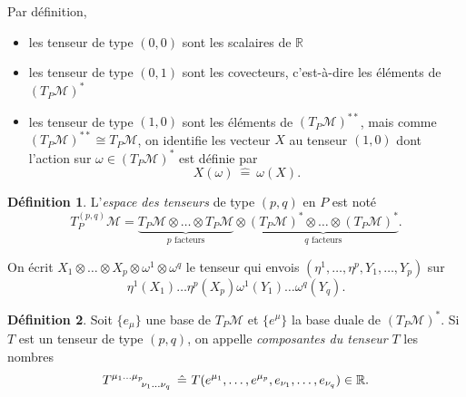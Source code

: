 \documentclass[a4paper,11pt]{report}
\theoremstyle{definition}
\theoremstyle{plain}
\theoremstyle{definition}
\newtheorem{defn}{Définition}[chapter]
\theoremstyle{remark}
\newcommand{\M}{\mathscr{M}}
\begin{document}
                Par définition,
                \begin{itemize}[label = \textbullet]
                    \item les tenseur de type $(0,0)$ sont les scalaires de $\mathbb{R}$
                    \item les tenseur de type $(0,1)$ sont les covecteurs, c'est-à-dire les éléments de $(T_P\M)^*$
                    \item les tenseur de type $(1,0)$ sont les éléments de $(T_P\M)^{**}$, mais comme $(T_P\M)^{**}\cong T_P\M$, on identifie les vecteur $X$ au tenseur $(1,0)$ dont l'action sur $\omega\in(T_P\M)^*$ est définie par
                    \begin{equation}
                        X(\omega)~\hat{=}~\omega(X).
                    \end{equation}
                \end{itemize}
                
                \begin{defn}
                    L'\textit{espace des tenseurs} de type $(p,q)$ en $P$ est noté
                    \begin{equation}
                        T^{(p,q)}_P\M = \underbrace{T_P\M\otimes\dots\otimes T_P\M}_{\text{$p$ facteurs}}\otimes \underbrace{(T_P\M)^*\otimes\dots\otimes (T_P\M)^*}_{\text{$q$ facteurs}}.
                    \end{equation}
                \end{defn}
                
                On écrit $X_1\otimes\dots\otimes X_p\otimes\omega^1\otimes\omega^q$ le tenseur qui envois $(\eta^1,\dots,\eta^p,Y_1,\dots,Y_p)$ sur
                \begin{equation}
                    \eta^1(X_1)\dots\eta^p(X_p)\omega^1(Y_1)\dots\omega^q(Y_q).
                \end{equation}
                
                \begin{defn}
                    Soit $\{e_\mu\}$ une base de $T_P\M$ et $\{e^\mu\}$ la base duale de $(T_P\M)^*$. Si $T$ est un tenseur de type $(p,q)$, on appelle \textit{composantes du tenseur} $T$ les nombres
                    \begin{equation}
                        T\indices{^{\mu_1\dots\mu_p}_{\nu_1\dots\nu_q}}~\hat{=}~T(e^{\mu_1},\dots,e^{\mu_p},e_{\nu_1},\dots,e_{\nu_q})\in\mathbb{R}.
                    \end{equation}
                \end{defn}
                
\end{document}
